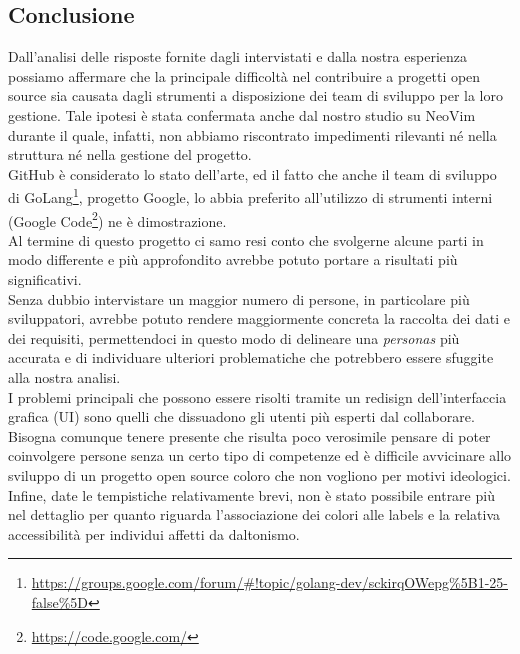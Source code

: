 \documentclass[12pt]{article} %
\begin{document}
\subsection{Conclusione}
Dall'analisi delle risposte fornite dagli intervistati e dalla nostra esperienza possiamo affermare che la principale difficolt\`a nel contribuire a progetti open source sia causata dagli strumenti a disposizione dei team di sviluppo per la loro gestione. Tale ipotesi \`e stata confermata anche dal nostro studio su NeoVim durante il quale, infatti, non abbiamo riscontrato impedimenti rilevanti n\'e nella struttura n\'e nella gestione del progetto.\\
GitHub \`e considerato lo stato dell'arte, ed il fatto che anche il team di sviluppo di GoLang\footnote{\url{https://groups.google.com/forum/#!topic/golang-dev/sckirqOWepg\%5B1-25-false\%5D}}, progetto Google, lo abbia preferito all'utilizzo di strumenti interni (Google Code\footnote{\url{https://code.google.com/}}) ne \`e dimostrazione.\\
Al termine di questo progetto ci samo resi conto che svolgerne alcune parti in modo differente e pi\`u approfondito avrebbe potuto portare a risultati pi\`u significativi.\\
Senza dubbio intervistare un maggior numero di persone, in particolare pi\`u sviluppatori, avrebbe potuto rendere maggiormente concreta la raccolta dei dati e dei requisiti, permettendoci in questo modo di delineare una \emph{personas} pi\`u accurata e di individuare ulteriori problematiche che potrebbero essere sfuggite alla nostra analisi.\\
I problemi principali che possono essere risolti tramite un redisign dell'interfaccia grafica (UI) sono quelli che dissuadono gli utenti pi\`u esperti dal collaborare. Bisogna comunque tenere presente che risulta poco verosimile pensare di poter coinvolgere persone senza un certo tipo di competenze ed \`e difficile avvicinare allo sviluppo di un progetto open source coloro che non vogliono per motivi ideologici.\\
Infine, date le tempistiche relativamente brevi, non \`e stato possibile entrare pi\`u nel dettaglio per quanto riguarda l'associazione dei colori alle labels e la relativa accessibilit\`a per individui affetti da daltonismo.


\newpage


\end{document}
